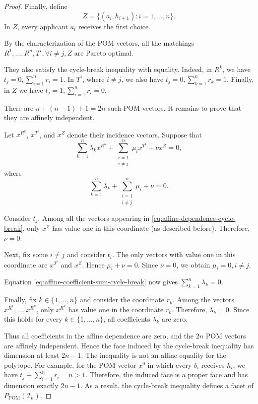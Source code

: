 \documentclass[12pt]{report}
\numberwithin{algorithm}{chapter}
\begin{document}
\begin{proof}
		Finally, define
		\begin{equation}
			Z = \{(a_i,h_{i+1}):i=1,\ldots,n\}.
		\end{equation}
		In $Z$, every applicant $a_i$ receives the first choice.
		
		By the characterization of the POM vectors, all the matchings
		$R^1,\ldots,R^n, T^i, \forall i\ne j, Z$ are Pareto optimal.
		
		They also satisfy the cycle-break inequality with equality. Indeed, in $R^k$, we have
		$t_j=0,\sum_{i=1}^{n}r_i=1.$
		In $T^i$, where $i\ne j$, we also have
		$t_j=0,\sum_{k=1}^{n}r_k=1.$
		Finally, in $Z$ we have
		$t_j=1,\sum_{i=1}^{n}r_i=0.$
		
		There are $n+(n-1)+1=2n$ such POM vectors. It remains to prove that they are affinely independent.
		
		Let $x^{R^k}$, $x^{T^i}$, and $x^Z$ denote their incidence vectors. Suppose that
		\begin{equation}\label{eq:affine-dependence-cycle-break}
			\sum_{k=1}^{n}\lambda_k x^{R^k}
			+
			\sum_{\substack{i=1\\i\ne j}}^{n}\mu_i x^{T^i}
			+
			\nu x^Z
			=0,
		\end{equation}
		where
		\begin{equation}\label{eq:affine-coefficient-sum-cycle-break}
			\sum_{k=1}^{n}\lambda_k
			+
			\sum_{\substack{i=1\\i\ne j}}^{n}\mu_i
			+
			\nu
			=0.
		\end{equation}
		
		Consider $t_j$. Among all the vectors appearing in \eqref{eq:affine-dependence-cycle-break}, only $x^Z$ has value one in this coordinate (as described before). Therefore, $\nu=0.$
		
		Next, fix some $i\ne j$ and consider $t_i$. The only vectors with value one in this coordinate are $x^{T^i}$ and $x^Z$. Hence
		$\mu_i+\nu=0.$
		Since $\nu=0$, we obtain
		$\mu_i=0,i\ne j.$
		
		Equation \eqref{eq:affine-coefficient-sum-cycle-break} now gives
		$\sum_{k=1}^{n}\lambda_k=0.$
		
		Finally, fix $k\in\{1,\ldots,n\}$ and consider the coordinate $r_k$. Among the vectors $x^{R^1},\ldots,x^{R^n}$, only $x^{R^k}$ has value one in the coordinate $r_k$. Therefore,
		$\lambda_k=0.$
		Since this holds for every $k\in\{1,\ldots,n\}$, all coefficients $\lambda_k$ are zero.
	
		Thus all coefficients in the affine dependence are zero, and the $2n$ POM vectors are affinely independent. Hence the face induced by the cycle-break inequality has dimension at least
		$2n-1.$
		The inequality is not an affine equality for the polytope. For example, for the POM vector $x^0$ in which every $b_i$ receives $h_i$, we have
		$
		t_j+\sum_{i=1}^{n}r_i=n>1.
		$
		Therefore, the induced face is a proper face and has dimension exactly
		$
		2n-1.
		$
		As a result, the cycle-break inequality defines a facet of
		$P_{\mathrm{POM}}(\mathcal{I}_n)$.
	\end{proof}
	
\end{document}
